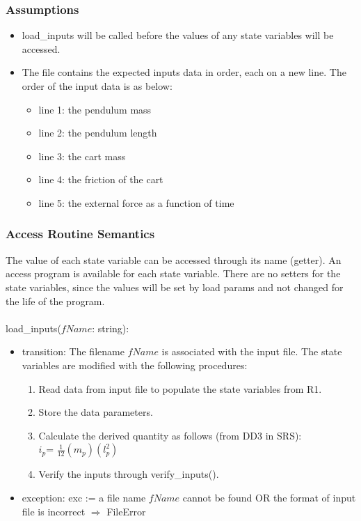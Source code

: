 \documentclass[12pt, titlepage]{article}
\begin{document}
\subsubsection{Assumptions}
\begin{itemize}

\item load\_inputs will be called before the values of any state variables will be accessed.

\item The file contains the expected inputs data in order, each on a new line. The order of the input data is as below:
\begin{itemize}
\item line 1: the pendulum mass  
\item line 2: the pendulum length   
\item line 3: the cart mass
\item line 4: the friction of the cart
\item line 5: the external force as a function of time
\end{itemize}

\end{itemize}
\subsubsection{Access Routine Semantics}
The value of each state variable can be accessed through its name (getter). An access program is available for each state variable. There are no setters for the state variables, since the values will be set by load params and not changed for the life of the program.\\
\\
\noindent load\_inputs($fName$: string):
\begin{itemize}
\item transition: The filename $fName$ is associated with the input file. The state variables are modified with the following procedures:
\begin{enumerate}
\item Read data  from input file to populate the state variables from R1.
\item Store the data parameters.
\item Calculate the derived quantity as follows (from DD3 in SRS):\\
        $i_p$= $\frac{1}{12}(m_p)(l_p^2)$ 
\item Verify the inputs through verify\_inputs().
\end{enumerate}

\item exception: exc := a file name $fName$ cannot be found OR the format of input file is incorrect $\Rightarrow$  FileError
\end{itemize}
\end{document}

